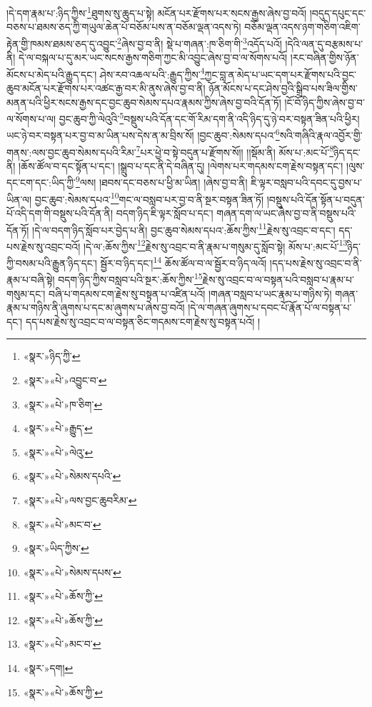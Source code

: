 །དེ་དག་རྣམ་པ་:ཉིད་ཀྱིས་\footnote{«སྣར་»ཉིད་ཀྱི་}ཐུགས་སུ་ཆུད་པ་སྟེ། མངོན་པར་རྫོགས་པར་སངས་རྒྱས་ཞེས་བྱ་བའོ། །བདུད་དཔུང་དང་བཅས་པ་ཐམས་ཅད་ཀྱི་གཡུལ་ཆེན་པོ་བཅོམ་པས་ན་བཅོམ་ལྡན་འདས་ཏེ། བཅོམ་ལྡན་འདས་ཉག་གཅིག་འཇིག་རྟེན་གྱི་ཁམས་ཐམས་ཅད་དུ་འབྱུང་\footnote{«སྣར་»«པེ་»འབྱུང་བ་}ཞེས་བྱ་བ་ནི། སྡེ་པ་གཞན་:ཁ་ཅིག་གི་\footnote{«སྣར་»«པེ་»ཁ་ཅིག་}འདོད་པའོ། །དེའི་ལན་དུ་བརྩམས་པ་ནི། དེ་ལ་བསྐལ་པ་དུ་མར་ཡང་སངས་རྒྱས་གཅིག་ཀྱང་མི་འབྱུང་ཞེས་བྱ་བ་ལ་སོགས་པའོ། །རང་བཞིན་གྱིས་ཉོན་མོངས་པ་མེད་པའི་རྒྱུད་དང་། ཤེས་རབ་འཆལ་པའི་:རྒྱུད་ཀྱིས་\footnote{«སྣར་»«པེ་»རྒྱུད་}ཀྱང་བླ་ན་མེད་པ་ཡང་དག་པར་རྫོགས་པའི་བྱང་ཆུབ་མངོན་པར་རྫོགས་པར་འཚང་རྒྱ་བར་མི་ནུས་ཞེས་བྱ་བ་ནི། ཉོན་མོངས་པ་དང་ཤེས་བྱའི་སྒྲིབ་པས་ཟིལ་གྱིས་མནན་པའི་ཕྱིར་སངས་རྒྱས་དང་བྱང་ཆུབ་སེམས་དཔའ་རྣམས་ཀྱིས་ཞེས་བྱ་བའི་དོན་ཏོ། །ངོ་བོ་ཉིད་ཀྱིས་ཞེས་བྱ་བ་ལ་སོགས་པ་ལ། བྱང་ཆུབ་ཀྱི་ལེའུའི་\footnote{«སྣར་»«པེ་»ལེའུ་}བསྡུས་པའི་དོན་དང་གོ་རིམ་དག་ནི་འདི་ཉིད་དུ་ཉེ་བར་བསྟན་ཟིན་པའི་ཕྱིར། ཡང་ཉེ་བར་བསྟན་པར་བྱ་བ་མ་ཡིན་པས་དེས་ན་མ་བྲིས་སོ། །བྱང་ཆུབ་:སེམས་དཔའ་\footnote{«སྣར་»«པེ་»སེམས་དཔའི་}སའི་གཞིའི་རྣལ་འབྱོར་གྱི་གནས་:ལས་བྱང་ཆུབ་སེམས་དཔའི་རིམ་\footnote{«སྣར་»«པེ་»ལས་བྱང་ཆུབརིམ་}པར་ཕྱེ་བ་སྟེ་བདུན་པ་རྫོགས་སོ།། །།སྡོམ་ནི། མོས་པ་:མང་པོ་\footnote{«སྣར་»«པེ་»མང་བ་}ཉིད་དང་ནི། །ཆོས་ཚོལ་བ་དང་སྟོན་པ་དང་། །སྒྲུབ་པ་དང་ནི་དེ་བཞིན་དུ། །ལེགས་པར་གདམས་ངག་རྗེས་བསྟན་དང་། །ལུས་དང་ངག་དང་:ཡིད་ཀྱི་\footnote{«སྣར་»ཡིད་ཀྱིས་}ལས། །ཐབས་དང་བཅས་པ་ཕྱི་མ་ཡིན། །ཞེས་བྱ་བ་ནི། ཇི་ལྟར་བསླབ་པའི་དབང་དུ་བྱས་པ་ཡིན་ལ། བྱང་ཆུབ་:སེམས་དཔའ་\footnote{«སྣར་»«པེ་»སེམས་དཔས་}གང་ལ་བསླབ་པར་བྱ་བ་ནི་སྔར་བསྟན་ཟིན་ཏོ། །བསྡུས་པའི་དོན་སྟོན་པ་བདུན་པོ་འདི་དག་གི་བསྡུས་པའི་དོན་ནི། བདག་ཉིད་ཇི་ལྟར་སློབ་པ་དང་། གཞན་དག་ལ་ཡང་ཞེས་བྱ་བ་ནི་བསྡུས་པའི་དོན་ཏོ། །དེ་ལ་བདག་ཉིད་སློབ་པར་བྱེད་པ་ནི། བྱང་ཆུབ་སེམས་དཔའ་:ཆོས་ཀྱིས་\footnote{«སྣར་»«པེ་»ཆོས་ཀྱི་}རྗེས་སུ་འབྲང་བ་དང་། དད་པས་རྗེས་སུ་འབྲང་བའོ། །དེ་ལ་:ཆོས་ཀྱིས་\footnote{«སྣར་»«པེ་»ཆོས་ཀྱི་}རྗེས་སུ་འབྲང་བ་ནི་རྣམ་པ་གསུམ་དུ་སློབ་སྟེ། མོས་པ་:མང་པོ་\footnote{«སྣར་»«པེ་»མང་བ་}ཉིད་ཀྱི་བསམ་པའི་རྒྱུན་ཉིད་དང་། སྦྱོར་བ་ཉིད་དང་།\footnote{«སྣར་»དག།} ཆོས་ཚོལ་བ་ལ་སྦྱོར་བ་ཉིད་ལའོ། །དད་པས་རྗེས་སུ་འབྲང་བ་ནི་རྣམ་པ་བཞི་སྟེ། བདག་ཉིད་ཀྱིས་བསླབ་པའི་སྔར་:ཆོས་ཀྱིས་\footnote{«སྣར་»«པེ་»ཆོས་ཀྱི་}རྗེས་སུ་འབྲང་བ་ལ་བསྟན་པའི་བསླབ་པ་རྣམ་པ་གསུམ་དང་། བཞི་པ་གདམས་ངག་རྗེས་སུ་བསྟན་པ་འཛིན་པའོ། །གཞན་བསླབ་པ་ཡང་རྣམ་པ་གཉིས་ཏེ། གཞན་རྣམ་པ་གཉིས་ནི་ཞུགས་པ་དང་མ་ཞུགས་པ་ཞེས་བྱ་བའོ། །དེ་ལ་གཞན་ཞུགས་པ་དབང་པོ་རྣོན་པོ་ལ་བསྟན་པ་དང་། དད་པས་རྗེས་སུ་འབྲང་བ་ལ་བསྟན་ཅིང་གདམས་ངག་རྗེས་སུ་བསྟན་པའོ། །

